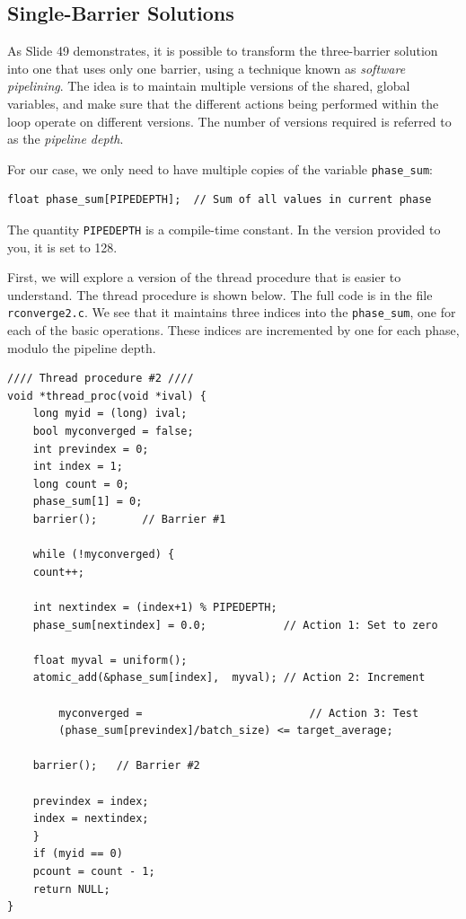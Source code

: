 \documentclass[11pt]{article}
\begin{document}
\subsection*{Single-Barrier Solutions}

As Slide 49 demonstrates, it is possible to transform the
three-barrier solution into one that uses only one barrier, using a
technique known as {\em software pipelining}.  The idea is to maintain
multiple versions of the shared, global variables, and make sure that
the different actions being performed within the loop operate on different versions.
The number of versions required is referred to as the {\em pipeline depth}.

For our case, we only need to have multiple copies of the variable \texttt{phase\_sum}:
\begin{lstlisting}
float phase_sum[PIPEDEPTH];  // Sum of all values in current phase
\end{lstlisting}
The quantity \texttt{PIPEDEPTH} is a compile-time constant.  In the
version provided to you, it is set to 128.

First, we will explore a version of the thread procedure that is
easier to understand.  The thread procedure is shown below.  The full
code is in the file \texttt{rconverge2.c}.  We see that it maintains
three indices into the \texttt{phase\_sum}, one for each of the basic
operations.  These indices are incremented by one for each phase,
modulo the pipeline depth.

\begin{lstlisting}
//// Thread procedure #2 ////
void *thread_proc(void *ival) {
    long myid = (long) ival;
    bool myconverged = false;
    int previndex = 0;
    int index = 1;
    long count = 0;
    phase_sum[1] = 0;
    barrier();       // Barrier #1

    while (!myconverged) {
	count++;

	int nextindex = (index+1) % PIPEDEPTH;
	phase_sum[nextindex] = 0.0;            // Action 1: Set to zero

	float myval = uniform();
	atomic_add(&phase_sum[index],  myval); // Action 2: Increment

        myconverged =                          // Action 3: Test
	    (phase_sum[previndex]/batch_size) <= target_average;

	barrier();   // Barrier #2

	previndex = index;
	index = nextindex;
    }
    if (myid == 0)
	pcount = count - 1;
    return NULL;
}
\end{lstlisting}
\end{document}
